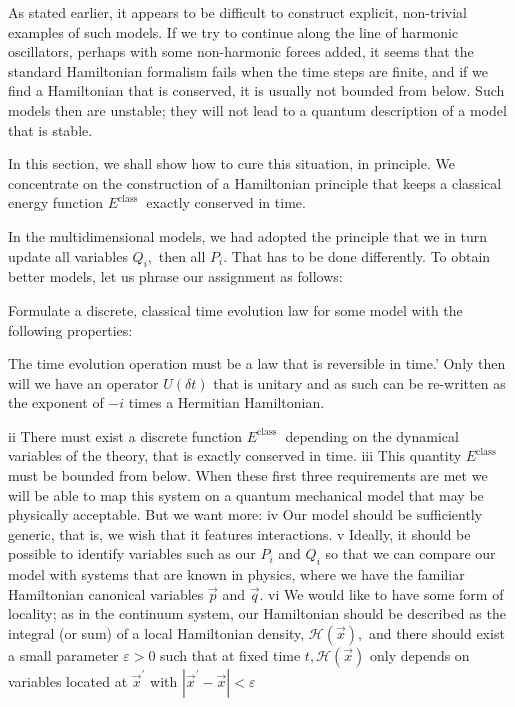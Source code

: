 \documentclass[main.tex]{subfiles}
\begin{document}
As stated earlier, it appears to be difficult to construct explicit, non-trivial examples of such models. If we try to continue along the line of harmonic oscillators, perhaps with some non-harmonic forces added, it seems that the standard Hamiltonian formalism fails when the time steps are finite, and if we find a Hamiltonian that is conserved, it is usually not bounded from below. Such models then are unstable; they will not lead to a quantum description of a model that is stable.

In this section, we shall show how to cure this situation, in principle. We concentrate on the construction of a Hamiltonian principle that keeps a classical energy function $E^{\text {class }}$ exactly conserved in time.

In the multidimensional models, we had adopted the principle that we in turn update all variables $Q_{i},$ then all $P_{i}$. That has to be done differently. To obtain better models, let us phrase our assignment as follows:

Formulate a discrete, classical time evolution law for some model with the following properties:

The time evolution operation must be a law that is reversible in time.' Only then will we have an operator $U(\delta t)$ that is unitary and as such can be re-written as the exponent of $-i$ times a Hermitian Hamiltonian.

ii There must exist a discrete function $E^{\text {class }}$ depending on the dynamical variables of the theory, that is exactly conserved in time.
iii This quantity $E^{\text {class }}$ must be bounded from below.
When these first three requirements are met we will be able to map this system on a quantum mechanical model that may be physically acceptable. But we want more:
iv Our model should be sufficiently generic, that is, we wish that it features interactions.
v Ideally, it should be possible to identify variables such as our $P_{i}$ and $Q_{i}$ so that we can compare our model with systems that are known in physics, where we have the familiar Hamiltonian canonical variables $\vec{p}$ and $\vec{q} .$
vi We would like to have some form of locality; as in the continuum system, our Hamiltonian should be described as the integral (or sum) of a local Hamiltonian density, $\mathcal{H}(\vec{x}),$ and there should exist a small parameter $\varepsilon>0$ such that at fixed time $t, \mathcal{H}(\vec{x})$ only depends on variables located at $\vec{x}^{\prime}$ with $\left|\vec{x}^{\prime}-\vec{x}\right|<\varepsilon$
\end{document}
